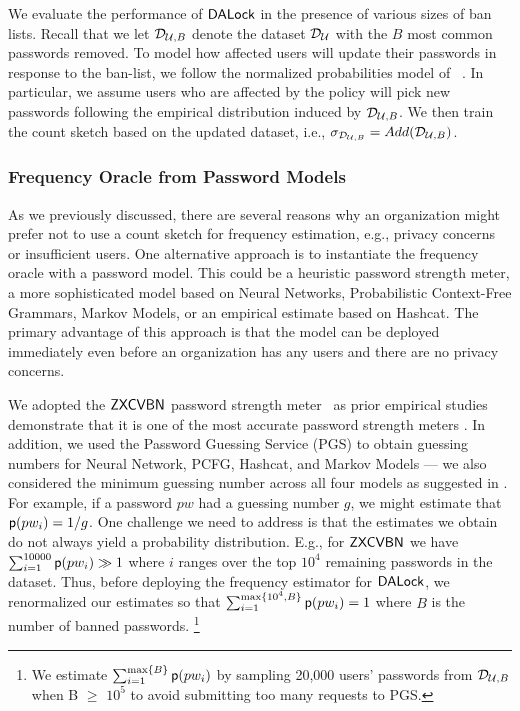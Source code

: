 We evaluate the performance of $\mathsf{DALock}$ in the presence of various sizes of ban lists. Recall that we let $\mathcal{D}_{{\mathcal{U}, B}}$ denote the dataset $\mathcal{D}_{{\mathcal{U}}}$ with the $B$ most common passwords removed. To model how affected users will update their passwords in response to the ban-list, we follow the normalized probabilities model of ~\cite{BKPS:ACMEC13}. In particular, we assume users who are affected by the policy will pick new passwords following the empirical distribution induced by $\mathcal{D}_{{\mathcal{U}, B}}$. We then train the count sketch based on the updated dataset, i.e., $\sigma_{\mathcal{D}_{{\mathcal{U}, B}}} = Add(\mathcal{D}_{{\mathcal{U}, B}})$.




\subsubsection{Frequency Oracle from Password Models}


As we previously discussed, there are several reasons why an organization might prefer not to use a count sketch for frequency estimation, e.g., privacy concerns or insufficient users. One alternative approach is to instantiate the frequency oracle with a password model. This could be a heuristic password strength meter, a more sophisticated model based on Neural Networks, Probabilistic Context-Free Grammars,  Markov Models, or an empirical estimate based on Hashcat. The primary advantage of this approach is that the model can be deployed immediately even before an organization has any users and there are no privacy concerns. 


We adopted the $\mathsf{ZXCVBN}$ password strength meter~\cite{USENIX:Wheeler16} as prior empirical studies demonstrate that it is one of the most accurate password strength meters \cite{CCS:GolDur18}. In addition, we used the Password Guessing Service (PGS) \cite{USENIX:USBCCKKMMS15,USENIX:MUSKBCC16} to obtain guessing numbers for Neural Network, PCFG, Hashcat, and Markov Models ---  we also considered the minimum guessing number across all four models as suggested in \cite{USENIX:USBCCKKMMS15}. For example, if a password $pw$ had a guessing number $g$, we might estimate that $\textsf{p}(pw_i) =1/g$. One challenge we need to address is that the estimates we obtain do not always yield a probability distribution. E.g., for $\mathsf{ZXCVBN}$ we have $\sum_{i=1}^{10000}\textsf{p}(pw_i) \gg 1$ where $i$ ranges over the top $10^4$ remaining passwords in the dataset. Thus, before deploying the frequency estimator for $\mathsf{DALock}$, we renormalized our estimates so that $\sum_{i=1}^{\max\{10^4, B\}}\textsf{p}(pw_i) =1$ where $B$ is the number of banned passwords. \footnote{We estimate $\sum_{i=1}^{\max\{B\}}\textsf{p}(pw_i)$ by sampling 20,000 users' passwords from $\mathcal{D}_{{\mathcal{U},B}}$ when B $\ge$ $10^5$ to avoid submitting too many requests to PGS.}











